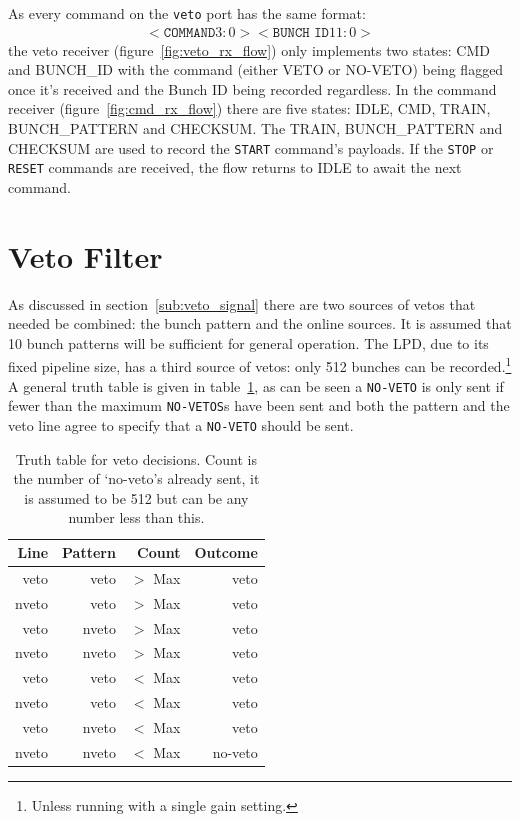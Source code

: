 As every command on the \texttt{veto} port has the same format:
\begin{align}
  <\texttt{COMMAND} 3:0><\texttt{BUNCH~ID} 11:0>
\end{align}
the veto receiver (figure~\ref{fig:veto_rx_flow}) only implements two states: CMD and BUNCH\_ID with the command (either VETO or NO-VETO) being flagged once it's received and the Bunch ID being recorded regardless. In the command receiver (figure~\ref{fig:cmd_rx_flow}) there are five states: IDLE, CMD, TRAIN, BUNCH\_PATTERN and CHECKSUM. The TRAIN, BUNCH\_PATTERN and CHECKSUM are used to record the \texttt{START} command's payloads. If the \texttt{STOP} or \texttt{RESET} commands are received, the flow returns to IDLE to await the next command. 
\section{Veto Filter} %
\label{sec:veto_filter}
As discussed in section~\ref{sub:veto_signal} there are two sources of vetos that needed be combined: the bunch pattern and the online sources. It is assumed that 10 bunch patterns will be sufficient for general operation. The LPD, due to its fixed pipeline size, has a third source of vetos: only 512 bunches can be recorded.\footnote{Unless running with a single gain setting.} A general truth table is given in table~\ref{tab:veto_truth_table}, as can be seen a \texttt{NO-VETO} is only sent if fewer than the maximum \texttt{NO-VETOS}s have been sent and both the pattern and the veto line agree to specify that a \texttt{NO-VETO} should be sent.
    
\begin{table}[htbp]
  \begin{center}
    \begin{tabular}{r|r|r||r}
      Line  & Pattern &   Count   & Outcome \\
      \hline
      veto  &   veto  & \(>\) Max & veto    \\
      nveto &   veto  & \(>\) Max & veto    \\
      veto  &  nveto  & \(>\) Max & veto    \\
      nveto &  nveto  & \(>\) Max & veto    \\
      \hline
      veto  &   veto  & \(<\) Max & veto    \\
      nveto &   veto  & \(<\) Max & veto    \\
      veto  &  nveto  & \(<\) Max & veto    \\
      nveto &  nveto  & \(<\) Max & no-veto \\
            
    \end{tabular}
  \end{center}
  \caption{Truth table for veto decisions. Count is the number of `no-veto's already sent, it is assumed to be 512 but can be any number less than this.}
  \label{tab:veto_truth_table}
\end{table}

